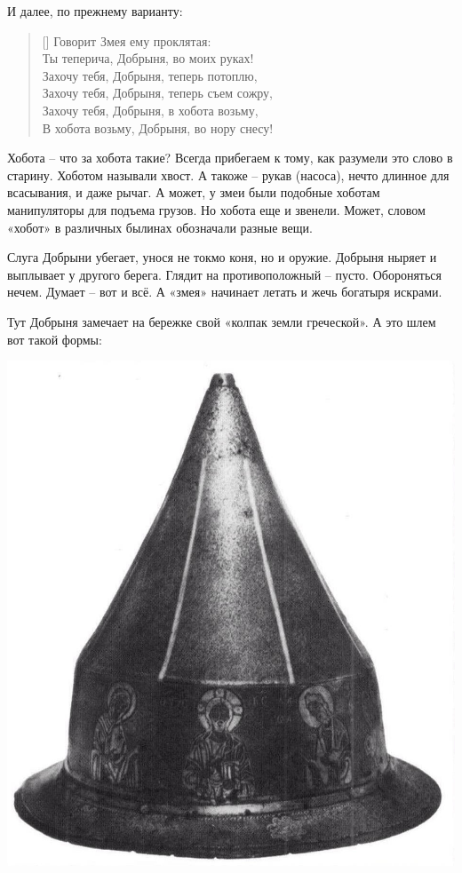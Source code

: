И далее, по прежнему варианту:

\settowidth{\versewidth}{Захочу тебя, Добрыня, теперь съем сожру,} 
\begin{verse}[\versewidth]
Говорит Змея ему проклятая:\\
Ты теперича, Добрыня, во моих руках!\\
Захочу тебя, Добрыня, теперь потоплю,\\
Захочу тебя, Добрыня, теперь съем сожру,\\
Захочу тебя, Добрыня, в хобота возьму,\\
В хобота возьму, Добрыня, во нору снесу!\\
\end{verse}

Хобота – что за хобота такие? Всегда прибегаем к тому, как разумели это слово в старину. Хоботом называли хвост. А такоже – рукав (насоса), нечто длинное для всасывания, и даже рычаг. А может, у змеи были подобные хоботам манипуляторы для подъема грузов. Но хобота еще и звенели. Может, словом «хобот» в различных былинах обозначали разные вещи.

Слуга Добрыни убегает, унося не токмо коня, но и оружие. Добрыня ныряет и выплывает у другого берега. Глядит на противоположный – пусто. Обороняться нечем. Думает – вот и всё. А «змея» начинает летать и жечь богатыря искрами.

Тут Добрыня замечает на бережке свой «колпак земли греческой». А это шлем вот такой формы:

\begin{center}
\includegraphics[width=0.60\linewidth]{chast-zmiy/dobrynya/kolpak-big.jpg}
\end{center}

